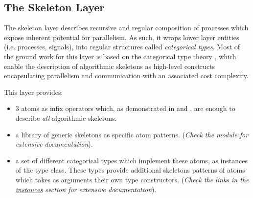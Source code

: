\subsection{The Skeleton Layer}
The skeleton layer describes recursive and regular composition
 of processes which expose inherent potential for parallelism. As
 such, it wraps lower layer entities (i.e. processes, signals),
 into regular structures called \emph{categorical types}. Most of the
 ground work for this layer is based on the categorical type
 theory \cite{Bird97}, which enable the description of
 algorithmic skeletons as high-level constructs encapsulating
 parallelism and communication with an associated cost complexity.\par
This layer provides:\par
\begin{itemize}
\item
3 atoms as infix operators which, as demonstrated in \cite{Bird97}
 and \cite{Skillicorn05}, are enough to describe \emph{all}
 algorithmic skeletons.\par

\item
a library of generic skeletons as specific atom patterns.
 (\emph{Check the  module for extensive}
 \emph{documentation}).\par

\item
a set of different categorical types which implement these
 atoms, as instances of the  type class. These types
 provide additional skeletons patterns of atoms which takes as
 arguments their own type constructors.
 (\emph{Check the links in the \hyperref[section.i:Skeleton]{instances} section for}
 \emph{extensive documentation}).\par

\end{itemize}

